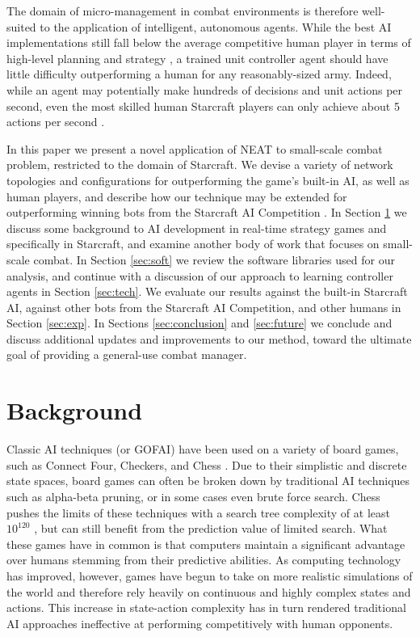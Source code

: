 \documentclass[a4paper]{article}
\begin{document}
The domain of micro-management in combat environments is therefore well-suited to the application of intelligent, autonomous agents. While the best AI implementations still fall below the average competitive human player in terms of high-level planning and strategy \cite{weber2011building}, a trained unit controller agent should have little difficulty outperforming a human for any reasonably-sized army. Indeed, while an agent may potentially make hundreds of decisions and unit actions per second, even the most skilled human Starcraft players can only achieve about 5 actions per second \cite{mccoy2008integrated}.

In this paper we present a novel application of NEAT to small-scale combat problem, restricted to the domain of Starcraft. We devise a variety of network topologies and configurations for outperforming the game's built-in AI, as well as human players, and describe how our technique may be extended for outperforming winning bots from the Starcraft AI Competition \cite{ai_competition}. In Section \ref{sec:back} we discuss some background to AI development in real-time strategy games and specifically in Starcraft, and examine another body of work that focuses on small-scale combat. In Section \ref{sec:soft} we review the software libraries used for our analysis, and continue with a discussion of our approach to learning controller agents in Section \ref{sec:tech}. We evaluate our results against the built-in Starcraft AI, against other bots from the Starcraft AI Competition, and other humans in Section \ref{sec:exp}. In Sections \ref{sec:conclusion} and \ref{sec:future} we conclude and discuss additional updates and improvements to our method, toward the ultimate goal of providing a general-use combat manager.

\section{Background}
\label{sec:back}

Classic AI techniques (or GOFAI) have been used on a variety of board games, such as Connect Four, Checkers, and Chess \cite{Allis94searchingfor}. Due to their simplistic and discrete state spaces, board games can often be broken down by traditional AI techniques such as alpha-beta pruning, or in some cases even brute force search. Chess pushes the limits of these techniques with a search tree complexity of at least $10^{120}$ \cite{Shannon:1988:PCP:61701.67002}, but can still benefit from the prediction value of limited search. What these games have in common is that computers maintain a significant advantage over humans stemming from their predictive abilities. As computing technology has improved, however, games have begun to take on more realistic simulations of the world and therefore rely heavily on continuous and highly complex states and actions. This increase in state-action complexity has in turn rendered traditional AI approaches ineffective at performing competitively with human opponents.
\end{document}
